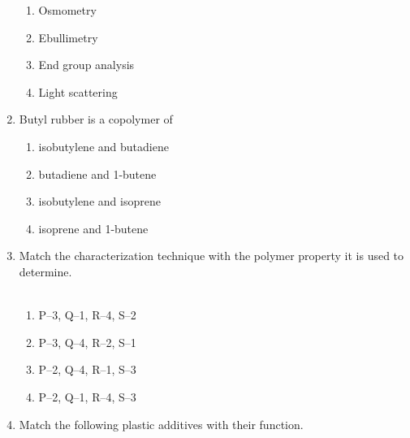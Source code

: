 \documentclass[journal,12pt,onecolumn]{IEEEtran}
\begin{document}
\begin{enumerate}[label=\arabic*)]
\vspace{0.2cm}
\begin{enumerate}[label=\alph*)]
\item Osmometry
\item Ebullimetry
\item End group analysis
\item Light scattering
\end{enumerate}

\vspace{0.5cm}

\item Butyl rubber is a copolymer of
\hfill{} \\

\vspace{0.2cm}
\begin{enumerate}[label=\alph*)]
\item isobutylene and butadiene
\item butadiene and 1-butene
\item isobutylene and isoprene
\item isoprene and 1-butene
\end{enumerate}

\vspace{0.5cm}

\item Match the characterization technique with the polymer property it is used to determine.
\hfill{} \\



\hfill{} \\

\vspace{0.2cm}
\begin{enumerate}[label=\alph*)]
\item P–3, Q–1, R–4, S–2
\item P–3, Q–4, R–2, S–1
\item P–2, Q–4, R–1, S–3
\item P–2, Q–1, R–4, S–3
\end{enumerate}

\newpage

\item Match the following plastic additives with their function.



\hfill{} \\


\end{enumerate}
\end{document}
